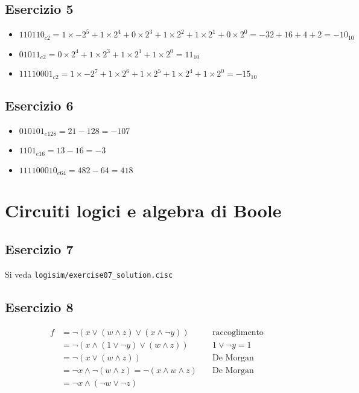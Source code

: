 \documentclass{article}
\def\code#1{\texttt{#1}}
\begin{document}
\subsection*{Esercizio 5}
\begin{itemize}
\item ${110110}_{c2} = 1\times-2^5 + 1\times2^4 + 0\times2^3 + 1\times2^2 + 1\times2^1 + 0\times2^0 = -32 + 16 + 4 + 2 = -10_{10}$
\item ${01011}_{c2} = 0\times2^4 + 1\times2^3 + 1\times2^1 + 1\times2^0 = 11_{10}$
\item ${11110001}_{c2} = 1\times-2^7 + 1\times2^6 + 1\times2^5 + 1\times2^4 + 1\times2^0 = -15_{10}$
\end{itemize}

\subsection*{Esercizio 6}
\begin{itemize}
\item ${010101}_{e128} = 21 - 128 = -107$
\item ${1101}_{e16} = 13 - 16 = -3$
\item ${111100010}_{e64} = 482 - 64 = 418$
\end{itemize}

\section*{Circuiti logici e algebra di Boole}
\subsection*{Esercizio 7}
Si veda \code{logisim/exercise07\_solution.cisc}

\subsection*{Esercizio 8}
\begin{align*}
f &= \neg(x \lor (w \land z) \lor (x \land \neg y)) \quad &\text{raccoglimento}\\
&= \neg(x \land (1 \lor \neg y) \lor (w \land z)) \quad &1\lor\neg y = 1\\
&= \neg(x \lor (w \land z)) \quad &\text{De Morgan}\\
&= \neg x \land \neg(w \land z) = \neg(x \land w \land z) \quad &\text{De Morgan}\\
&= \neg x \land(\neg w \lor \neg z)
\end{align*}
\end{document}
